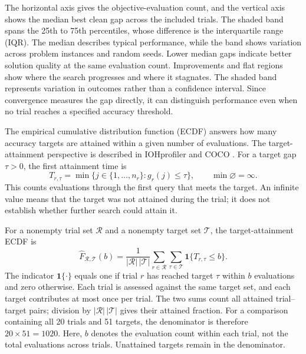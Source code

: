 The horizontal axis gives the objective-evaluation count, and the
vertical axis shows the median best clean gap across the included trials.
The shaded band spans the 25th to 75th percentiles, whose difference is
the interquartile range (IQR). The median describes typical performance,
while the band shows variation across problem instances and random seeds.
Lower median gaps indicate better solution quality at the same evaluation
count. Improvements and flat regions show where the search progresses
and where it stagnates. The shaded band represents variation in outcomes
rather than a confidence interval. Since convergence measures the gap
directly, it can distinguish performance even when no trial reaches a
specified accuracy threshold.

The empirical cumulative distribution function (ECDF) answers how many
accuracy targets are attained within a given number of evaluations.
The target-attainment perspective is described in IOHprofiler
\cite{Doerr2018IOHprofiler} and COCO
\cite{Hansen2016Performance}. For a target gap $\tau>0$, the
first attainment time is
\begin{equation}
    T_{r,\tau}
    =
    \min\{j\in\{1,\ldots,n_r\}:g_r(j)\leq\tau\},
    \qquad
    \min\varnothing=\infty.
    \label{eq:benchmark_target_hitting_time}
\end{equation}
This counts evaluations through the first query that meets the target.
An infinite value means that the target was not attained during the
trial; it does not establish whether further search could attain it.

For a nonempty trial set $\mathcal R$ and a nonempty target set
$\mathcal T$, the target-attainment ECDF is
\begin{equation}
    \widehat F_{\mathcal R,\mathcal T}(b)
    =
    \frac{1}{|\mathcal R|\,|\mathcal T|}
    \sum_{r\in\mathcal R}
    \sum_{\tau\in\mathcal T}
    \mathbf{1}\{T_{r,\tau}\leq b\}.
    \label{eq:benchmark_target_ecdf}
\end{equation}
The indicator $\mathbf{1}\{\cdot\}$ equals one if trial $r$ has reached
target $\tau$ within $b$ evaluations and zero otherwise. Each trial is
assessed against the same target set, and each target contributes at most
once per trial. The two sums count all attained trial--target pairs;
division by $|\mathcal R|\,|\mathcal T|$ gives their attained fraction.
For a comparison containing all 20 trials and 51 targets, the denominator
is therefore $20\times51=1020$. Here, $b$ denotes the evaluation count
within each trial, not the total evaluations across trials.
Unattained targets remain in the denominator.

